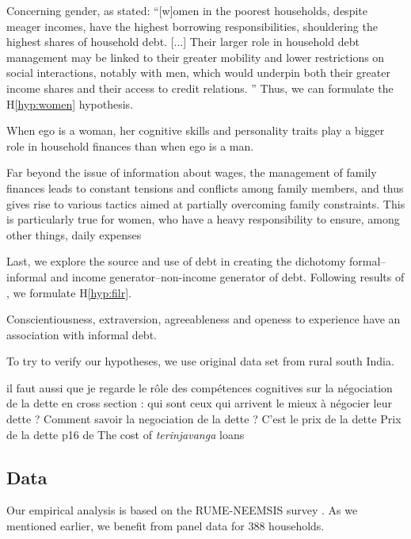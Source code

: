 \documentclass[a4paper, 11pt, onecolumn]{article}
\begin{document}
Concerning gender, as \cite{Reboul2020} stated: ``[w]omen in the poorest households, despite meager incomes, have the highest borrowing responsibilities, shouldering the highest shares of household debt. [...] Their larger role in household debt management may be linked to their greater mobility and lower restrictions on social interactions, notably with men, which would underpin both their greater income shares and their access to credit relations. ''
Thus, we can formulate the H\ref{hyp:women} hypothesis.
\begin{hyp} \label{hyp:women}
When ego is a woman, her cognitive skills and personality traits play a bigger role in household finances than when ego is a man.
\end{hyp}

\cite{Reboul2019} Far beyond the issue of information about wages, the management of family finances leads
to constant tensions and conflicts among family members, and thus gives rise to various tactics
aimed at partially overcoming family constraints. This is particularly true for women, who have
a heavy responsibility to ensure, among other things, daily expenses


Last, we explore the source and use of debt in creating the dichotomy formal--informal and income generator--non-income generator of debt.
Following results of \cite{Brown2014}, we formulate H\ref{hyp:filr}.
\begin{hyp} \label{hyp:filr}
Conscientiousness, extraversion, agreeableness and openess to experience have an association with informal debt.
\end{hyp}

To try to verify our hypotheses, we use original data set from rural south India.

\cite{Guerin2014a} il faut aussi que je regarde le rôle des compétences cognitives sur la négociation de la dette en cross section : qui sont ceux qui arrivent le mieux à négocier leur dette ? 
Comment savoir la negociation de la dette ? C'est le prix de la dette
Prix de la dette p16 de \cite{Guerin2014a} The cost of \textit{terinjavanga} loans


	\subsection{Data}

Our empirical analysis is based on the RUME-NEEMSIS survey \citep{NEEMSISreport, NEEMSIS2017}. %
As we mentioned earlier, we benefit from panel data for 388 households.
\end{document}
